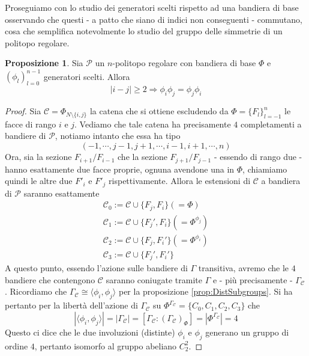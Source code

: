 \documentclass[a4paper,12pt]{report}
\newcommand{\p}{\mathcal{P}}
\theoremstyle{plain}
\theoremstyle{definition}
\newtheorem{prop}[teo]{Proposizione}
\begin{document}
Proseguiamo con lo studio dei generatori scelti rispetto ad una bandiera di base osservando che questi - a patto che siano di indici
non conseguenti - commutano, cosa che semplifica notevolmente lo studio del gruppo delle simmetrie di un politopo regolare.
\begin{prop}
\label{prop:CommutatingGenerators}
Sia $\p$ un $n$-politopo regolare con bandiera di base $\Phi$ e $(\phi_l)_{l=0}^{n-1}$ generatori scelti. Allora
\begin{equation*}
|i-j|\geq 2\Longrightarrow \phi_i\phi_j=\phi_j\phi_i
\end{equation*}
\end{prop}
\begin{proof}
Sia $\mathcal{C}=\Phi_{N\setminus\{i,j\}}$ la catena che si ottiene escludendo da $\Phi=\{F_l\}_{l=-1}^n$ le facce di rango $i$ e $j$. Vediamo che tale
catena ha precisamente $4$ completamenti a bandiere di $\p$, notiamo intanto che essa ha tipo
\begin{equation*}
(-1,\cdots,j-1,j+1,\cdots,i-1,i+1,\cdots,n)
\end{equation*}
Ora, sia la sezione $F_{i+1}/F_{i-1}$ che la sezione $F_{j+1}/F_{j-1}$ - essendo di rango due - hanno esattamente due facce proprie, ognuna avendone una
in $\Phi$, chiamiamo quindi le altre due $F'_i$ e $F'_j$ rispettivamente. Allora le estensioni di $\mathcal{C}$ a bandiera di $\p$ saranno esattamente
\begin{gather*}
\mathcal{C}_0:=\mathcal{C}\cup\{F_j,F_i\}(=\Phi)\\
\mathcal{C}_1:=\mathcal{C}\cup\{F_j',F_i\}(=\Phi^{\phi_j})\\
\mathcal{C}_2:=\mathcal{C}\cup\{F_j,F_i'\}(=\Phi^{\phi_i})\\
\mathcal{C}_3:=\mathcal{C}\cup\{F_j',F_i'\}
\end{gather*}
A questo punto, essendo l'azione sulle bandiere di $\Gamma$ transitiva, avremo che le $4$ bandiere che contengono $\mathcal{C}$ saranno coniugate
tramite $\Gamma$ e - pi\`u precisamente - $\Gamma_\mathcal{C}$. Ricordiamo che $\Gamma_\mathcal{C}\cong\langle\phi_i,\phi_j\rangle$ per
la proposizione \ref{prop:DistSubgroups}. Si ha pertanto per la libert\`a dell'azione di $\Gamma_\mathcal{C}$ su
$\Phi^{\Gamma_\mathcal{C}}=\{C_0,C_1,C_2,C_3\}$ che
\begin{equation*}
|\langle\phi_i,\phi_j\rangle|=|\Gamma_\mathcal{C}|=\left[\Gamma_\mathcal{C}:(\Gamma_\mathcal{C})_\Phi\right]=\left|\Phi^{\Gamma_\mathcal{C}}\right|=4
\end{equation*}
Questo ci dice che le due involuzioni (distinte) $\phi_i$ e $\phi_j$ generano un gruppo di ordine $4$, pertanto isomorfo al gruppo abeliano $C_2^2$.
\end{proof}
\end{document}
